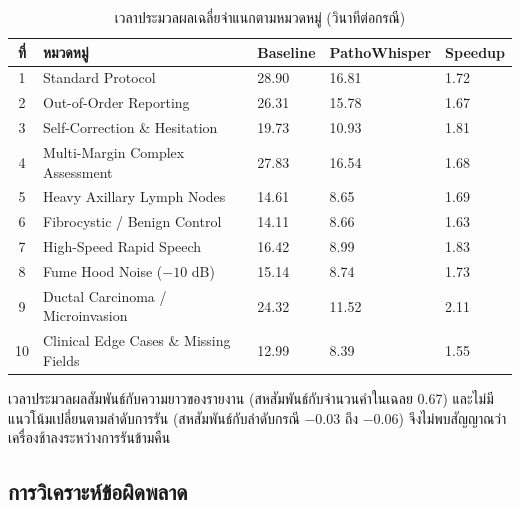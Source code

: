 \begin{table}[H]
\centering
\caption{เวลาประมวลผลเฉลี่ยจำแนกตามหมวดหมู่ (วินาทีต่อกรณี)}
\label{tab:latcat}
\footnotesize\setlength{\tabcolsep}{3pt}
\begin{tabular}{|c|p{4.4cm}|p{2.2cm}|p{3.4cm}|p{2.2cm}|}
\hline
\textbf{ที่} & \textbf{หมวดหมู่} & \textbf{Baseline} & \textbf{PathoWhisper} & \textbf{Speedup} \\
\hline
1 & Standard Protocol & 28.90 & 16.81 & 1.72 \\
\hline
2 & Out-of-Order Reporting & 26.31 & 15.78 & 1.67 \\
\hline
3 & Self-Correction \& Hesitation & 19.73 & 10.93 & 1.81 \\
\hline
4 & Multi-Margin Complex Assessment & 27.83 & 16.54 & 1.68 \\
\hline
5 & Heavy Axillary Lymph Nodes & 14.61 & 8.65 & 1.69 \\
\hline
6 & Fibrocystic / Benign Control & 14.11 & 8.66 & 1.63 \\
\hline
7 & High-Speed Rapid Speech & 16.42 & 8.99 & 1.83 \\
\hline
8 & Fume Hood Noise ($-10$ dB) & 15.14 & 8.74 & 1.73 \\
\hline
9 & Ductal Carcinoma / Microinvasion & 24.32 & 11.52 & 2.11 \\
\hline
10 & Clinical Edge Cases \& Missing Fields & 12.99 & 8.39 & 1.55 \\
\hline
\end{tabular}
\end{table}

\noindent เวลาประมวลผลสัมพันธ์กับความยาวของรายงาน (สหสัมพันธ์กับจำนวนคำในเฉลย 0.67) และไม่มีแนวโน้มเปลี่ยนตามลำดับการรัน (สหสัมพันธ์กับลำดับกรณี $-0.03$ ถึง $-0.06$) จึงไม่พบสัญญาณว่าเครื่องช้าลงระหว่างการรันข้ามคืน

\subsection{การวิเคราะห์ข้อผิดพลาด}

